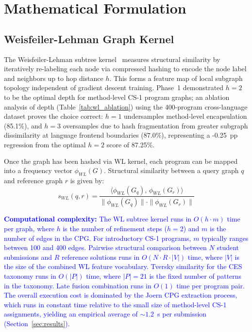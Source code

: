 \section{Mathematical Formulation}
\label{sec:implementation}

\subsection{Weisfeiler-Lehman Graph Kernel}
\label{subsec:wl_kernel}

The Weisfeiler-Lehman subtree kernel~\cite{ref_shervashidze2011} measures structural similarity by iteratively re-labeling each node via compressed hashing to encode the node label and neighbors up to hop distance $h$. This forms a feature map of local subgraph topology independent of gradient descent training. Phase~1 demonstrated $h=2$ to be the optimal depth for method-level CS-1 program graphs; an ablation analysis of depth (Table~\ref{tab:wl_ablation}) using the 400-program cross-language dataset proves the choice correct: $h=1$ undersamples method-level encapsulation (85.1\%), and $h=3$ oversamples due to hash fragmentation from greater subgraph dissimilarity at language frontend boundaries (87.0\%), representing a -0.25~pp regression from the optimal $h=2$ score of 87.25\%.

Once the graph has been hashed via WL kernel, each program can be mapped into a frequency vector $\phi_{WL}(G)$. Structural similarity between a query graph $q$ and reference graph $r$ is given by:
\begin{equation}
    s_{WL}(q,r) = \frac{\langle \phi_{WL}(G_q),\, \phi_{WL}(G_r) \rangle}{\|\phi_{WL}(G_q)\| \cdot \|\phi_{WL}(G_r)\|}
\end{equation}

\textcolor{blue}{\textbf{Computational complexity:} The WL subtree kernel runs in $O(h \cdot m)$ time per graph, where $h$ is the number of refinement steps ($h{=}2$) and $m$ is the number of edges in the CPG. For introductory CS-1 programs, $m$ typically ranges between 100 and 400 edges. Pairwise structural comparison between $N$ student submissions and $R$ reference solutions runs in $O(N \cdot R \cdot |V|)$ time, where $|V|$ is the size of the combined WL feature vocabulary. Tversky similarity for the CES taxonomy runs in $O(|P|)$ time, where $|P|{=}21$ is the fixed number of patterns in the taxonomy. Late fusion combination runs in $O(1)$ time per program pair. The overall execution cost is dominated by the Joern CPG extraction process, which runs in constant time relative to the small size of method-level CS-1 assignments, yielding an empirical average of ${\sim}1.2$~s per submission (Section~\ref{sec:results}).}


